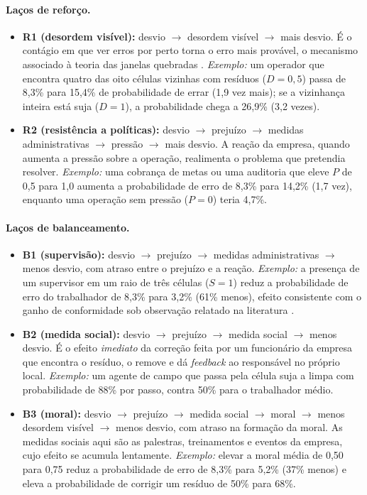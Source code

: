 \documentclass[11pt, a4paper]{article}
\begin{document}
\paragraph{Laços de reforço.}
\begin{itemize}
  \item \textbf{R1 (desordem visível):} desvio $\rightarrow$ desordem visível $\rightarrow$ mais desvio. É o contágio em que ver erros por perto torna o erro mais provável, o mecanismo associado à teoria das janelas quebradas \citep{ball2012}. \emph{Exemplo:} um operador que encontra quatro das oito células vizinhas com resíduos ($D=0{,}5$) passa de 8,3\% para 15,4\% de probabilidade de errar (1,9 vez mais); se a vizinhança inteira está suja ($D=1$), a probabilidade chega a 26,9\% (3,2 vezes).
  \item \textbf{R2 (resistência a políticas):} desvio $\rightarrow$ prejuízo $\rightarrow$ medidas administrativas $\rightarrow$ pressão $\rightarrow$ mais desvio. A reação da empresa, quando aumenta a pressão sobre a operação, realimenta o problema que pretendia resolver. \emph{Exemplo:} uma cobrança de metas ou uma auditoria que eleve $P$ de 0,5 para 1,0 aumenta a probabilidade de erro de 8,3\% para 14,2\% (1,7 vez), enquanto uma operação sem pressão ($P=0$) teria 4,7\%.
\end{itemize}

\paragraph{Laços de balanceamento.}
\begin{itemize}
  \item \textbf{B1 (supervisão):} desvio $\rightarrow$ prejuízo $\rightarrow$ medidas administrativas $\rightarrow$ menos desvio, com atraso entre o prejuízo e a reação. \emph{Exemplo:} a presença de um supervisor em um raio de três células ($S=1$) reduz a probabilidade de erro do trabalhador de 8,3\% para 3,2\% (61\% menos), efeito consistente com o ganho de conformidade sob observação relatado na literatura \citep{srigley2014}.
  \item \textbf{B2 (medida social):} desvio $\rightarrow$ prejuízo $\rightarrow$ medida social $\rightarrow$ menos desvio. É o efeito \emph{imediato} da correção feita por um funcionário da empresa que encontra o resíduo, o remove e dá \emph{feedback} ao responsável no próprio local. \emph{Exemplo:} um agente de campo que passa pela célula suja a limpa com probabilidade de 88\% por passo, contra 50\% para o trabalhador médio.
  \item \textbf{B3 (moral):} desvio $\rightarrow$ prejuízo $\rightarrow$ medida social $\rightarrow$ moral $\rightarrow$ menos desordem visível $\rightarrow$ menos desvio, com atraso na formação da moral. As medidas sociais aqui são as palestras, treinamentos e eventos da empresa, cujo efeito se acumula lentamente. \emph{Exemplo:} elevar a moral média de 0,50 para 0,75 reduz a probabilidade de erro de 8,3\% para 5,2\% (37\% menos) e eleva a probabilidade de corrigir um resíduo de 50\% para 68\%.
\end{itemize}
\end{document}
